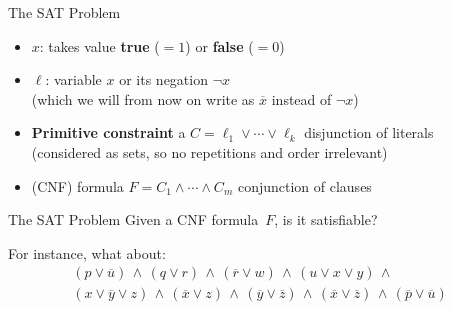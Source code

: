 \documentclass{cons-beamer}
\begin{document}
\begin{frame}{The SAT Problem}
	\begin{itemize}
		\item {} $x$: takes value \textbf{true} ($=1$) or \textbf{false} ($=0$)
		\vfill
		
		\item {} $\ell$: variable $x$ or its negation $\neg x$\\
		(which we will from now on write as $\overline{x}$ instead of $\neg x$)
		\vfill		
		
		\item \textbf{Primitive constraint} a  $C = \ell_1 \lor \cdots \lor \ell_{k}$ \quad disjunction of literals \\
		(considered as sets, so no repetitions and order irrelevant)
		\vfill
		
		\item {} (CNF) formula $F = C_1 \land \cdots \land C_m$ \quad conjunction of clauses         
	\end{itemize}
	\vfill
	
	\begin{block}{The SAT Problem}
		Given a CNF formula~$F$, is it satisfiable?
	\end{block}
	\vfill
	
	For instance, what about:
	\begin{gather*}
		( p \lor \overline{u} )
		\,\land\,
		( q \lor r )
		\,\land\,
		( \overline{r} \lor w )
		\,\land\,
		( u \lor x \lor y )
		\,\land\,
		\\ %
		( x \lor \overline{y} \lor z )
		\,\land\,
		( \overline{x} \lor z )
		\,\land\,
		( \overline{y} \lor \overline{z} )
		\,\land\,
		( \overline{x} \lor \overline{z} )
		\,\land\,
		( \overline{p} \lor \overline{u} )
	\end{gather*}
\end{frame}
\end{document}
